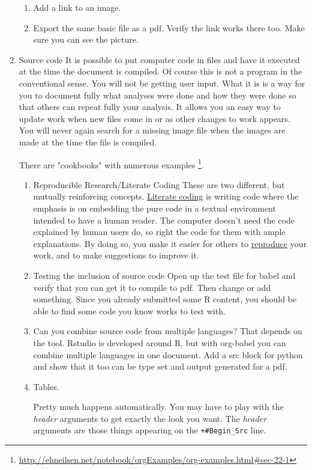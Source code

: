 \documentclass{article}
\begin{document}
\begin{enumerate}
\begin{enumerate}
\item Add a link to an image.
\item Export the same basic file as a pdf. Verify the link works there too. Make sure you can see the picture.
\end{enumerate}
\item Source code
\label{sec:org461d804}
It is possible to put computer code in files and have it executed at the time the document is compiled. Of course this is not a program in the conventional sense. You will not be getting user input. What it is is a way for you to document fully what analyses were done and how they were done so that others can repeat fully your analysis. It allows you an easy way to update work when new files come in or as other changes to work appears. You will never again search for a missing image file when the images are made at the time the file is compiled.

There are "cookbooks" with numerous examples \footnote{\url{http://ehneilsen.net/notebook/orgExamples/org-examples.html\#sec-22-1}}. 
\begin{enumerate}
\item Reproducible Research/Literate Coding
\label{sec:org2e966ce}
These are two different, but mutually reinforcing concepts. \href{https://en.wikipedia.org/wiki/Literate\_programming}{Literate coding} is writing code where the emphasis is on embedding the pure code in a textual environment intended to have a human reader. The computer doesn't need the code explained by human users do, so right the code for them with ample explanations. By doing so, you make it easier for others to \href{https://www.pnas.org/content/112/6/1645/}{reproduce} your work, and to make suggestions to improve it. 
\item Testing the inclusion of source code
\label{sec:org1d3e462}
Open up the test file for babel and verify that you can get it to compile to pdf. Then change or add something. Since you already submitted some R content, you should be able to find some code you know works to test with. 
\item Can you combine source code from multiple languages?
\label{sec:org01439e0}
That depends on the tool. Rstudio is developed around R, but with org-babel you can combine multiple languages in one document. Add a src block for python and show that it too can be type set and output generated for a pdf. 
\item Tables.
\label{sec:orgb7d9da1}

Pretty much happens automatically. You may have to play with the \emph{header} arguments to get exactly the look you want. The \emph{header} arguments are those things appearing on the \texttt{+\#Begin\_Src} line. 


\end{enumerate}
\end{enumerate}
\end{document}
